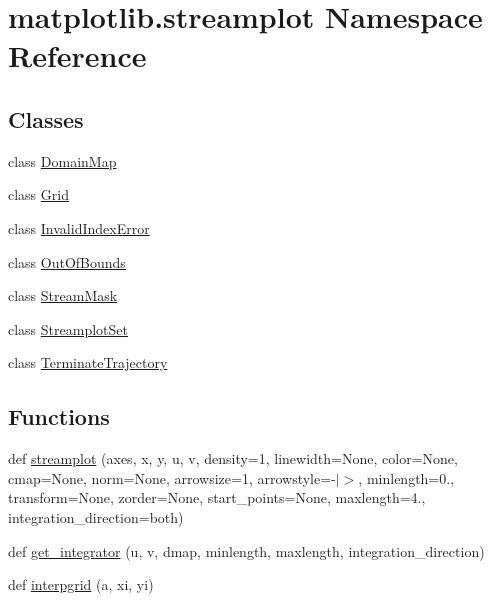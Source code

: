 \hypertarget{namespacematplotlib_1_1streamplot}{}\section{matplotlib.\+streamplot Namespace Reference}
\label{namespacematplotlib_1_1streamplot}
\subsection*{Classes}
\begin{DoxyCompactItemize}
\item 
class \hyperlink{classmatplotlib_1_1streamplot_1_1DomainMap}{Domain\+Map}
\item 
class \hyperlink{classmatplotlib_1_1streamplot_1_1Grid}{Grid}
\item 
class \hyperlink{classmatplotlib_1_1streamplot_1_1InvalidIndexError}{Invalid\+Index\+Error}
\item 
class \hyperlink{classmatplotlib_1_1streamplot_1_1OutOfBounds}{Out\+Of\+Bounds}
\item 
class \hyperlink{classmatplotlib_1_1streamplot_1_1StreamMask}{Stream\+Mask}
\item 
class \hyperlink{classmatplotlib_1_1streamplot_1_1StreamplotSet}{Streamplot\+Set}
\item 
class \hyperlink{classmatplotlib_1_1streamplot_1_1TerminateTrajectory}{Terminate\+Trajectory}
\end{DoxyCompactItemize}
\subsection*{Functions}
\begin{DoxyCompactItemize}
\item 
def \hyperlink{namespacematplotlib_1_1streamplot_a3a50c1d3e0dc4a5f7fe29905972e80f6}{streamplot} (axes, x, y, u, v, density=1, linewidth=None, color=None, cmap=None, norm=None, arrowsize=1, arrowstyle=\textquotesingle{}-\/$\vert$$>$\textquotesingle{}, minlength=0., transform=None, zorder=None, start\+\_\+points=None, maxlength=4., integration\+\_\+direction=\textquotesingle{}both\textquotesingle{})
\item 
def \hyperlink{namespacematplotlib_1_1streamplot_ab25ae2ba512a6686fe92afdfb33ee89c}{get\+\_\+integrator} (u, v, dmap, minlength, maxlength, integration\+\_\+direction)
\item 
def \hyperlink{namespacematplotlib_1_1streamplot_a670940257c94db8f5dd662775e239ef8}{interpgrid} (a, xi, yi)
\end{DoxyCompactItemize}


